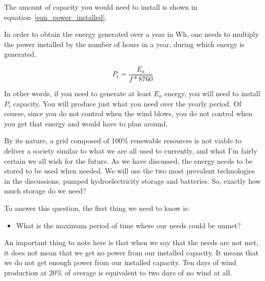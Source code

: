 The amount of capacity you would need to install is shown in equation~\ref{eqn_power_installed}.

\begin{remark}
In order to obtain the energy generated over a year in Wh, one needs to multiply the power installed by the number of hours in a year, during which energy is generated.

\begin{equation}\label{eqn_power_installed}
P_i = \frac{E_a}{f * 8760}
\end{equation}

\end{remark}

In other words, if you need to generate at least $E_a$ energy, you will need to install $P_i$ capacity. You will produce just what you need over the yearly period. Of course, since you do not control when the wind blows, you do not control when you get that energy and would have to plan around.

By its nature, a grid composed of 100\% renewable resources is not viable to deliver a society similar to what we are all used to currently, and what I'm fairly certain we all wish for the future. As we have discussed, the energy needs to be stored to be used when needed. We will use the two most prevalent technologies in the discussions, pumped hydroelectricity storage and batteries. So, exactly how much storage do we need?

To answer this question, the first thing we need to know is:

\begin{itemize}
\item What is the maximum period of time where our needs could be unmet?
\end{itemize}

An important thing to note here is that when we say that the needs are not met, it does not mean that we get no power from our installed capacity. It means that we do not get enough power from our installed capacity. Ten days of wind production at 20\% of average is equivalent to two days of no wind at all.

